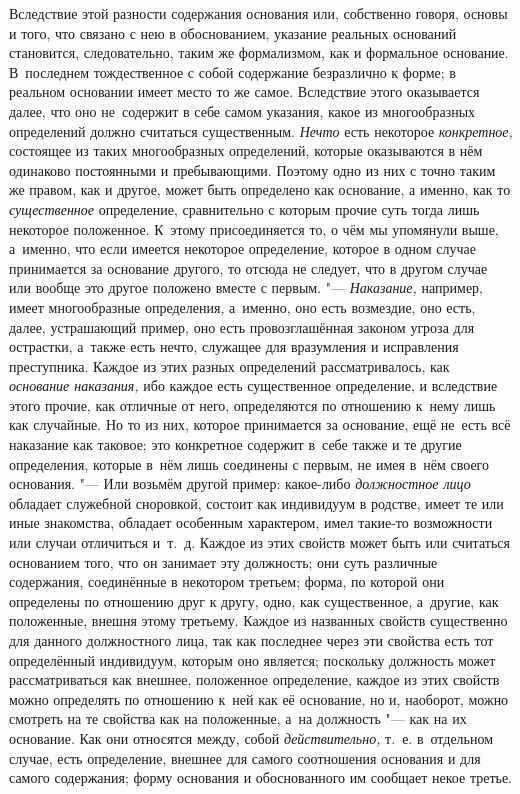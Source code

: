 Вследствие этой разности содержания основания или, собственно говоря, основы и
того, что связано с нею в обоснованием, указание реальных оснований становится,
следовательно, таким же формализмом, как и формальное основание. В~последнем
тождественное с собой содержание безразлично к форме; в реальном основании
имеет место то же самое. Вследствие этого оказывается далее, что оно
не~содержит в себе самом указания, какое из многообразных определений должно
считаться существенным. {\em Нечто} есть некоторое {\em конкретное,} состоящее
из таких многообразных определений, которые оказываются в нём одинаково
постоянными и пребывающими. Поэтому одно из них с точно таким же правом, как и
другое, может быть определено как основание, а именно, как то
{\em существенное} определение, сравнительно с которым прочие суть тогда лишь
некоторое положенное. К~этому присоединяется то, о чём мы упомянули выше,
а~именно, что если имеется некоторое определение, которое в одном случае
принимается за основание другого, то отсюда не следует, что в другом случае или
вообще это другое положено вместе с первым. "--- {\em Наказание,} например,
имеет многообразные определения, а~именно, оно есть возмездие, оно есть, далее,
устрашающий пример, оно есть провозглашённая законом угроза для острастки,
а~также есть нечто, служащее для вразумления и исправления преступника. Каждое
из этих разных определений рассматривалось, как {\em основание наказания,} ибо
каждое есть существенное определение, и вследствие этого прочие, как отличные
от него, определяются по отношению к~нему лишь как случайные. Но то из них,
которое принимается за основание, ещё не~есть всё наказание как таковое; это
конкретное содержит в~себе также и те другие определения, которые в~нём лишь
соединены с первым, не имея в~нём своего основания. "--- Или возьмём другой
пример: какое-либо {\em должностное лицо} обладает служебной сноровкой, состоит
как индивидуум в родстве, имеет те или иные знакомства, обладает особенным
характером, имел такие-то возможности или случаи отличиться и~т.~д. Каждое из
этих свойств может быть или считаться основанием того, что он занимает эту
должность; они суть различные содержания, соединённые в некотором третьем;
форма, по которой они определены по отношению друг к другу, одно, как
существенное, а~другие, как положенные, внешня этому третьему. Каждое из
названных свойств существенно для данного должностного лица, так как последнее
через эти свойства есть тот определённый индивидуум, которым оно является;
поскольку должность может рассматриваться как внешнее, положенное определение,
каждое из этих свойств можно определять по отношению к~ней как её основание, но
и, наоборот, можно смотреть на те свойства как на положенные, а~на должность
"--- как на их основание. Как они относятся между, собой {\em действительно,}
т.~е. в~отдельном случае, есть определение, внешнее для самого соотношения
основания и для самого содержания; форму основания и обоснованного им сообщает
некое третье.

